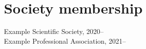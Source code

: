 \section{\sc Society membership}
Example Scientific Society, 2020--\\
Example Professional Association, 2021--\\
